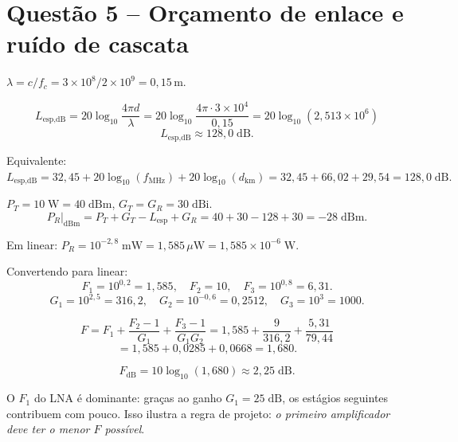 \documentclass[11pt,a4paper]{article}
\begin{document}
\section*{Questão 5 -- Orçamento de enlace e ruído de cascata}

\begin{resolucao}

$\lambda = c/f_c = 3\times 10^8/2\times 10^9 = 0{,}15$\,m.

\[
  L_{\text{esp}, \text{dB}} = 20\log_{10}\!\frac{4\pi d}{\lambda}
                            = 20\log_{10}\!\frac{4\pi \cdot 3\times 10^4}{0{,}15}
                            = 20\log_{10}(2{,}513 \times 10^6)
\]
\[
  \boxed{L_{\text{esp}, \text{dB}} \approx 128{,}0\;\text{dB}.}
\]

Equivalente: $L_{\text{esp}, \text{dB}} = 32{,}45 + 20\log_{10}(f_{\text{MHz}}) + 20\log_{10}(d_{\text{km}}) = 32{,}45 + 66{,}02 + 29{,}54 = 128{,}0\;\text{dB}.$ \checkmark
\end{resolucao}

\begin{resolucao}

$P_T = 10\;\text{W} = 40\;\text{dBm}$, $G_T = G_R = 30\;\text{dBi}$.
\[
  P_R\big|_{\text{dBm}} = P_T + G_T - L_{\text{esp}} + G_R = 40 + 30 - 128 + 30 = \boxed{-28\;\text{dBm}.}
\]

Em linear: $P_R = 10^{-2{,}8}\;\text{mW} = 1{,}585\,\mu\text{W} = 1{,}585\times 10^{-6}\;\text{W}.$
\end{resolucao}

\begin{resolucao}

Convertendo para linear:
\[
  F_1 = 10^{0{,}2} = 1{,}585, \quad F_2 = 10, \quad F_3 = 10^{0{,}8} = 6{,}31.
\]
\[
  G_1 = 10^{2{,}5} = 316{,}2, \quad G_2 = 10^{-0{,}6} = 0{,}2512, \quad G_3 = 10^{3} = 1000.
\]

\[
  F = F_1 + \frac{F_2 - 1}{G_1} + \frac{F_3 - 1}{G_1 G_2}
    = 1{,}585 + \frac{9}{316{,}2} + \frac{5{,}31}{79{,}44}
\]
\[
    = 1{,}585 + 0{,}0285 + 0{,}0668 = 1{,}680.
\]

\[
  \boxed{F_{\text{dB}} = 10\log_{10}(1{,}680) \approx 2{,}25\;\text{dB}.}
\]

O $F_1$ do LNA é dominante: graças ao ganho $G_1 = 25\;\text{dB}$, os estágios seguintes contribuem com pouco. Isso ilustra a regra de projeto: \emph{o primeiro amplificador deve ter o menor $F$ possível}.
\end{resolucao}
\end{document}
